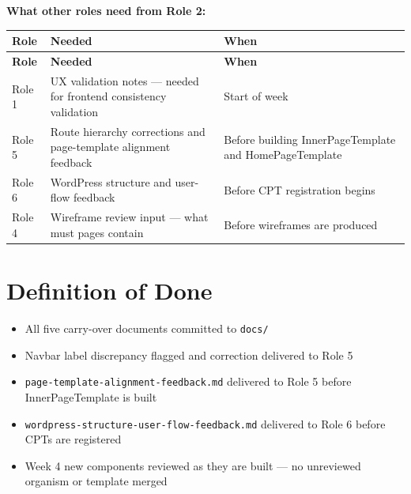 \documentclass[12pt,a4paper]{article}
\begin{document}
\vspace{0.8em}
\noindent\textbf{What other roles need from Role 2:}

\vspace{0.5em}
\begin{longtable}{@{}p{2cm}p{6.5cm}p{3.8cm}@{}}
\toprule
\rowcolor{uvtLightBlue}
\textbf{Role} & \textbf{Needed} & \textbf{When} \\
\midrule
\endfirsthead
\toprule
\rowcolor{uvtLightBlue}
\textbf{Role} & \textbf{Needed} & \textbf{When} \\
\midrule
\endhead
\bottomrule
\endfoot
Role 1 & UX validation notes --- needed for frontend consistency validation & Start of week \\
Role 5 & Route hierarchy corrections and page-template alignment feedback & Before building InnerPageTemplate and HomePageTemplate \\
Role 6 & WordPress structure and user-flow feedback & Before CPT registration begins \\
Role 4 & Wireframe review input --- what must pages contain & Before wireframes are produced \\
\end{longtable}

\section{Definition of Done}

\begin{itemize}
    \item[$\square$] All five carry-over documents committed to \texttt{docs/}
    \item[$\square$] Navbar label discrepancy flagged and correction delivered to Role 5
    \item[$\square$] \texttt{page-template-alignment-feedback.md} delivered to Role 5 before InnerPageTemplate is built
    \item[$\square$] \texttt{wordpress-structure-user-flow-feedback.md} delivered to Role 6 before CPTs are registered
    \item[$\square$] Week 4 new components reviewed as they are built --- no unreviewed organism or template merged
\end{itemize}
\end{document}
